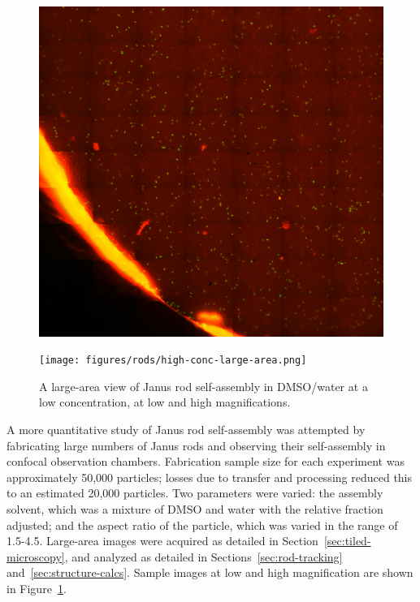 \begin{figure}
\begin{center}
\includegraphics[width=0.5\linewidth]{figures/rods/janus-tiled-large-area.jpg} \\

\vspace{12pt}

\texttt{[image: figures/rods/high-conc-large-area.png]}
\end{center}
\caption{
A large-area view of Janus rod self-assembly in DMSO/water at a low concentration,
at low and high magnifications.}
\label{fig:large-area}
\end{figure}



A more quantitative study of Janus rod self-assembly was attempted by fabricating large 
numbers of Janus rods and observing their self-assembly in confocal observation chambers.
Fabrication sample size for each experiment was approximately 50,000 particles; losses
due to transfer and processing reduced this to an estimated 20,000 particles.
Two parameters were varied: the assembly solvent, which was a mixture of DMSO and water
with the relative fraction adjusted; and the aspect ratio of the particle, which was varied
in the range of 1.5-4.5.  Large-area images were acquired as detailed in 
Section~\ref{sec:tiled-microscopy}, and analyzed as detailed in Sections~\ref{sec:rod-tracking}
and~\ref{sec:structure-calcs}.  Sample images at low and high magnification are shown
in Figure~\ref{fig:large-area}.

